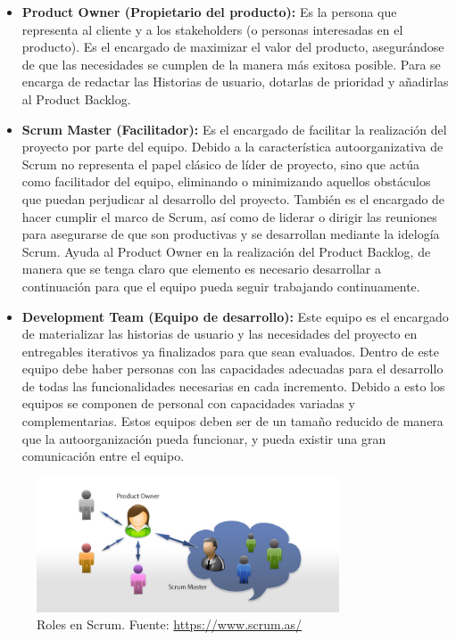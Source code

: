 \begin{itemize}
\item \textbf{Product Owner (Propietario del producto):} Es la persona que representa al cliente y a los stakeholders (o personas interesadas en el producto). Es el encargado de maximizar el valor del producto, asegurándose de que las necesidades se cumplen de la manera más exitosa posible. Para se encarga de redactar las Historias de usuario, dotarlas de prioridad y añadirlas al Product Backlog.

\item \textbf{Scrum Master (Facilitador):} Es el encargado de facilitar la realización del proyecto por parte del equipo. Debido a la característica autoorganizativa de Scrum no representa el papel clásico de líder de proyecto, sino que actúa como facilitador del equipo, eliminando o minimizando aquellos obstáculos que puedan perjudicar al desarrollo del proyecto. También es el encargado de hacer cumplir el marco de Scrum, así como de liderar o dirigir las reuniones para asegurarse de que son productivas y se desarrollan mediante la idelogía Scrum. Ayuda al Product Owner en la realización del Product Backlog, de manera que se tenga claro que elemento es necesario desarrollar a continuación para que el equipo pueda seguir trabajando continuamente.

\item \textbf{Development Team (Equipo de desarrollo):} Este equipo es el encargado de materializar las historias de usuario y las necesidades del proyecto en entregables iterativos ya finalizados para que sean evaluados. Dentro de este equipo debe haber personas con las capacidades adecuadas para el desarrollo de todas las funcionalidades necesarias en cada incremento. Debido a esto los equipos se componen de personal con capacidades variadas y complementarias. Estos equipos deben ser de un tamaño reducido de manera que la autoorganización pueda funcionar, y pueda existir una gran comunicación entre el equipo. 
\end{itemize} 

\begin{figure}[!h]
\begin{center}
\includegraphics[width=0.8\textwidth]{./figures/scrum-roles.jpg}
\caption{Roles en Scrum. Fuente: \href{https://www.scrum.as/}{https://www.scrum.as/}}
\label{fig:scrum-roles}
\end{center}
\end{figure}

